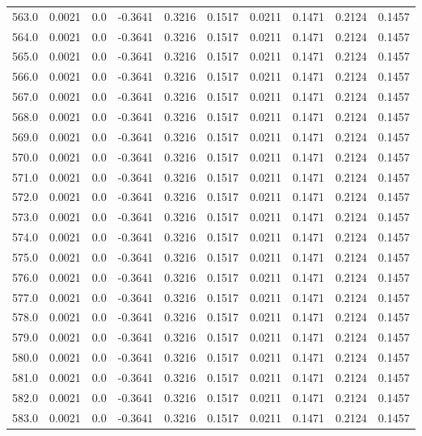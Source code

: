 \begin{longtable}{lrrrrrrrrr}
563.0 & 0.0021 & 0.0 & -0.3641 & 0.3216 & 0.1517 & 0.0211 & 0.1471 & 0.2124 & 0.1457 \\
564.0 & 0.0021 & 0.0 & -0.3641 & 0.3216 & 0.1517 & 0.0211 & 0.1471 & 0.2124 & 0.1457 \\
565.0 & 0.0021 & 0.0 & -0.3641 & 0.3216 & 0.1517 & 0.0211 & 0.1471 & 0.2124 & 0.1457 \\
566.0 & 0.0021 & 0.0 & -0.3641 & 0.3216 & 0.1517 & 0.0211 & 0.1471 & 0.2124 & 0.1457 \\
567.0 & 0.0021 & 0.0 & -0.3641 & 0.3216 & 0.1517 & 0.0211 & 0.1471 & 0.2124 & 0.1457 \\
568.0 & 0.0021 & 0.0 & -0.3641 & 0.3216 & 0.1517 & 0.0211 & 0.1471 & 0.2124 & 0.1457 \\
569.0 & 0.0021 & 0.0 & -0.3641 & 0.3216 & 0.1517 & 0.0211 & 0.1471 & 0.2124 & 0.1457 \\
570.0 & 0.0021 & 0.0 & -0.3641 & 0.3216 & 0.1517 & 0.0211 & 0.1471 & 0.2124 & 0.1457 \\
571.0 & 0.0021 & 0.0 & -0.3641 & 0.3216 & 0.1517 & 0.0211 & 0.1471 & 0.2124 & 0.1457 \\
572.0 & 0.0021 & 0.0 & -0.3641 & 0.3216 & 0.1517 & 0.0211 & 0.1471 & 0.2124 & 0.1457 \\
573.0 & 0.0021 & 0.0 & -0.3641 & 0.3216 & 0.1517 & 0.0211 & 0.1471 & 0.2124 & 0.1457 \\
574.0 & 0.0021 & 0.0 & -0.3641 & 0.3216 & 0.1517 & 0.0211 & 0.1471 & 0.2124 & 0.1457 \\
575.0 & 0.0021 & 0.0 & -0.3641 & 0.3216 & 0.1517 & 0.0211 & 0.1471 & 0.2124 & 0.1457 \\
576.0 & 0.0021 & 0.0 & -0.3641 & 0.3216 & 0.1517 & 0.0211 & 0.1471 & 0.2124 & 0.1457 \\
577.0 & 0.0021 & 0.0 & -0.3641 & 0.3216 & 0.1517 & 0.0211 & 0.1471 & 0.2124 & 0.1457 \\
578.0 & 0.0021 & 0.0 & -0.3641 & 0.3216 & 0.1517 & 0.0211 & 0.1471 & 0.2124 & 0.1457 \\
579.0 & 0.0021 & 0.0 & -0.3641 & 0.3216 & 0.1517 & 0.0211 & 0.1471 & 0.2124 & 0.1457 \\
580.0 & 0.0021 & 0.0 & -0.3641 & 0.3216 & 0.1517 & 0.0211 & 0.1471 & 0.2124 & 0.1457 \\
581.0 & 0.0021 & 0.0 & -0.3641 & 0.3216 & 0.1517 & 0.0211 & 0.1471 & 0.2124 & 0.1457 \\
582.0 & 0.0021 & 0.0 & -0.3641 & 0.3216 & 0.1517 & 0.0211 & 0.1471 & 0.2124 & 0.1457 \\
583.0 & 0.0021 & 0.0 & -0.3641 & 0.3216 & 0.1517 & 0.0211 & 0.1471 & 0.2124 & 0.1457 \\

\end{longtable}
